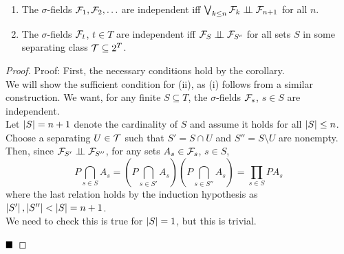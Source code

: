 \begin{lemma}
    \vspace{-0.5cm}
    \begin{enumerate}[label = \roman*)]
        \item The $\sigma$-fields $\cal{F}_1, \cal{F}_2, \ldots$ are independent iff $\bigvee_{k \leq n} \cal{F}_k \perp\!\!\!\perp \cal{F}_{n + 1}$ for all $n$.
        \item The $\sigma$-fields $\cal{F}_t$, $t \in T$ are independent iff $\cal{F}_S \perp\!\!\!\perp \cal{F}_{S^{c}}$ for all sets $S$ in some separating class $\cal{T} \subseteq 2^{T}$.
    \end{enumerate}
\end{lemma}
\begin{proof}{Proof:}
    First, the necessary conditions hold by the corollary.\\

    We will show the sufficient condition for (ii), as (i) follows from a similar construction. We want, for any finite $S \subseteq T$, the $\sigma$-fields $\cal{F}_s$, $s \in S$ are independent.\\

    
    Let $\abs{S} = n + 1$ denote the cardinality of $S$ and assume it holds for all $\abs{S} \leq n$. Choose a separating $U \in \cal{T}$ such that $S' = S \cap U$ and $S'' = S \setminus U$ are nonempty. Then, since $\cal{F}_{S'} \perp\!\!\!\perp \cal{F}_{S''}$, for any sets $A_s \in \cal{F}_s$, $s \in S$,
    \[ P\bigcap_{s \in S} A_s = \left(P\bigcap_{s \in S'} A_s\right)\left(P\bigcap_{s \in S''} A_s\right) = \prod_{s \in S} PA_s \]
    where the last relation holds by the induction hypothesis as $\abs{S'}, \abs{S''} < \abs{S} = n + 1$.\\

    We need to check this is true for $\abs{S} = 1$, but this is trivial.

    $\qed$
\end{proof}
